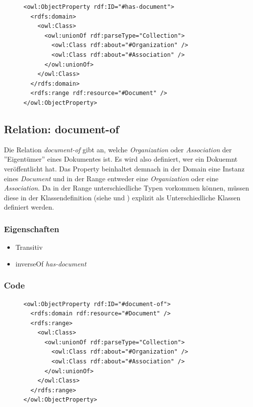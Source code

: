 \documentclass[
    11pt,
    latin1,
    a4paper,
    oneside
]{scrreprt}
\begin{document}
\begin{figure}[H]
 \lstset{language=XML}
 \begin{lstlisting}[label=owl:hasdocument,caption={Die Relation \emph{has-document} verkn\"upft eine \emph{Organization} mit einem \emph{Document}}]
<owl:ObjectProperty rdf:ID="#has-document">
  <rdfs:domain>
    <owl:Class>
      <owl:unionOf rdf:parseType="Collection">
        <owl:Class rdf:about="#Organization" />
        <owl:Class rdf:about="#Association" />
      </owl:unionOf>
    </owl:Class>
  </rdfs:domain>
  <rdfs:range rdf:resource="#Document" />
</owl:ObjectProperty>
 \end{lstlisting}
\end{figure}


\subsection{Relation: document-of} \label{sec:rel_documentof}

Die Relation \emph{document-of} gibt an, welche \emph{Organization} oder \emph{Association} der ''Eigent\"umer'' eines Dokumentes ist. Es wird also definiert, wer ein Dokuemnt ver\"offentlicht hat. Das Property beinhaltet demnach in der Domain eine Instanz eines \emph{Document} und in der Range entweder eine \emph{Organization} oder eine \emph{Association}. Da in der Range unterschiedliche Typen vorkommen k\"onnen, m\"ussen diese in der Klassendefinition (siehe  und ) explizit als Unterschiedliche Klassen definiert werden.

\subsubsection{Eigenschaften} \label{sec:rel_documentof_settings}

\begin{itemize}
  \item Transitiv
  \item inverseOf \emph{has-document}
\end{itemize}

\subsubsection{Code} \label{sec:rel_documentof_code}

\begin{figure}[H]
 \lstset{language=XML}
 \begin{lstlisting}[label=owl:documentof,caption={Die Relation \emph{document-of} gibt an, welche \emph{Organization} oder \emph{Association} das \emph{Document} ver\"offentlicht hat}]
<owl:ObjectProperty rdf:ID="#document-of">
  <rdfs:domain rdf:resource="#Document" />
  <rdfs:range>
    <owl:Class>
      <owl:unionOf rdf:parseType="Collection">
        <owl:Class rdf:about="#Organization" />
        <owl:Class rdf:about="#Association" />
      </owl:unionOf>
    </owl:Class>
  </rdfs:range>
</owl:ObjectProperty>
 \end{lstlisting}
\end{figure}
\end{document}
